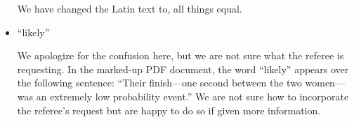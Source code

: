\documentclass[12pt]{article}
\begin{document}
\begin{itemize}
  We have changed the Latin text to, all things equal.
  
\item ``likely''

  We apologize for the confusion here, but we are not sure what the
  referee is requesting.  In the marked-up PDF document, the word
  ``likely'' appears over the following sentence: ``Their finish—one
  second between the two women—was an extremely low probability
  event.''  We are not sure how to incorporate the referee's request
  but are happy to do so if given more information.

\end{itemize}

 
\end{document}
